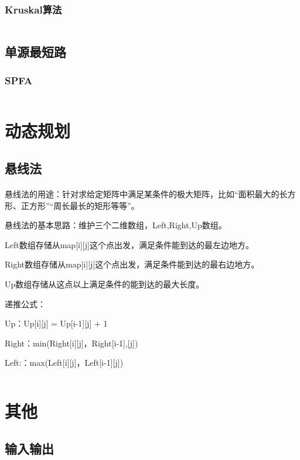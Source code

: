 \documentclass[a4paper,11pt]{article}
\begin{document}
\subsubsection{Kruskal算法} %
\inputminted[breaklines,linenos,frame=leftline]{c++}{graph/kruskal.cpp}
\subsection{单源最短路}
\subsubsection{SPFA}
\inputminted[breaklines]{c++}{graph/spfa.cc}
\newpage
\section{动态规划}
\subsection{悬线法}
\paragraph{}
悬线法的用途：针对求给定矩阵中满足某条件的极大矩阵，比如“面积最大的长方形、正方形”“周长最长的矩形等等”。

悬线法的基本思路：维护三个二维数组，Left,Right,Up数组。

Left数组存储从map[i][j]这个点出发，满足条件能到达的最左边地方。

Right数组存储从map[i][j]这个点出发，满足条件能到达的最右边地方。

Up数组存储从这点以上满足条件的能到达的最大长度。

递推公式：

Up：Up[i][j] = Up[i-1][j] + 1

Right：min(Right[i][j]，Right[i-1],[j])

Left:：max(Left[i][j]，Left[i-1][j])
\inputminted[breaklines,linenos,frame=leftline]{c++}{DP/StretchedWire.cpp}

\newpage
\section{其他}
\subsection{输入输出}
\end{document}
